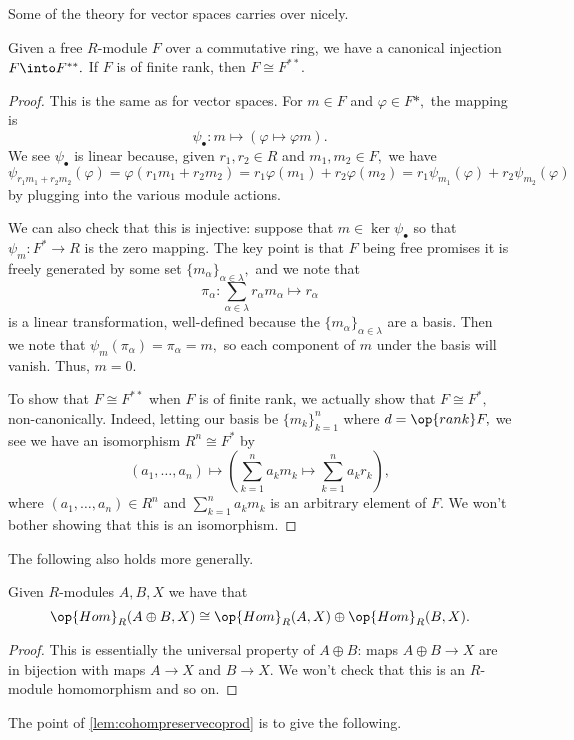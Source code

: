 \documentclass[../notes.tex]{subfiles}
\begin{document}
Some of the theory for vector spaces carries over nicely.
\begin{proposition}
	Given a free $R$-module $F$ over a commutative ring, we have a canonical injection $F\into F^{**}.$ If $F$ is of finite rank, then $F\cong F^{**}.$
\end{proposition}
\begin{proof}
	This is the same as for vector spaces. For $m\in F$ and $\varphi\in F*,$ the mapping is
	\[\psi_\bullet:m\mapsto(\varphi\mapsto\varphi m).\]
	We see $\psi_\bullet$ is linear because, given $r_1,r_2\in R$ and $m_1,m_2\in F,$ we have
	\[\psi_{r_1m_1+r_2m_2}(\varphi)=\varphi(r_1m_1+r_2m_2)=r_1\varphi(m_1)+r_2\varphi(m_2)=r_1\psi_{m_1}(\varphi)+r_2\psi_{m_2}(\varphi)\]
	by plugging into the various module actions.
	
	We can also check that this is injective: suppose that $m\in\ker\psi_\bullet$ so that $\psi_m:F^*\to R$ is the zero mapping. The key point is that $F$ being free promises it is freely generated by some set $\{m_\alpha\}_{\alpha\in\lambda},$ and we note that
	\[\pi_\alpha:\sum_{\alpha\in\lambda}r_\alpha m_\alpha\mapsto r_\alpha\]
	is a linear transformation, well-defined because the $\{m_\alpha\}_{\alpha\in\lambda}$ are a basis. Then we note that $\psi_m(\pi_\alpha)=\pi_\alpha=m,$ so each component of $m$ under the basis will vanish. Thus, $m=0.$

	To show that $F\cong F^{**}$ when $F$ is of finite rank, we actually show that $F\cong F^*,$ non-canonically. Indeed, letting our basis be $\{m_k\}_{k=1}^n$ where $d=\op{rank}F,$ we see we have an isomorphism $R^n\cong F^*$ by
	\[(a_1,\ldots,a_n)\mapsto\left(\sum_{k=1}^na_km_k\mapsto\sum_{k=1}^na_kr_k\right),\]
	where $(a_1,\ldots,a_n)\in R^n$ and $\sum_{k=1}^na_km_k$ is an arbitrary element of $F.$ We won't bother showing that this is an isomorphism.
\end{proof}
The following also holds more generally.
\begin{lemma} \label{lem:cohompreservecoprod}
	Given $R$-modules $A,B,X$ we have that
	\[\op{Hom}_R(A\oplus B,X)\cong\op{Hom}_R(A,X)\oplus\op{Hom}_R(B,X).\]
\end{lemma}
\begin{proof}
	This is essentially the universal property of $A\oplus B$: maps $A\oplus B\to X$ are in bijection with maps $A\to X$ and $B\to X.$ We won't check that this is an $R$-module homomorphism and so on.
\end{proof}
The point of \autoref{lem:cohompreservecoprod} is to give the following.
\end{document}
